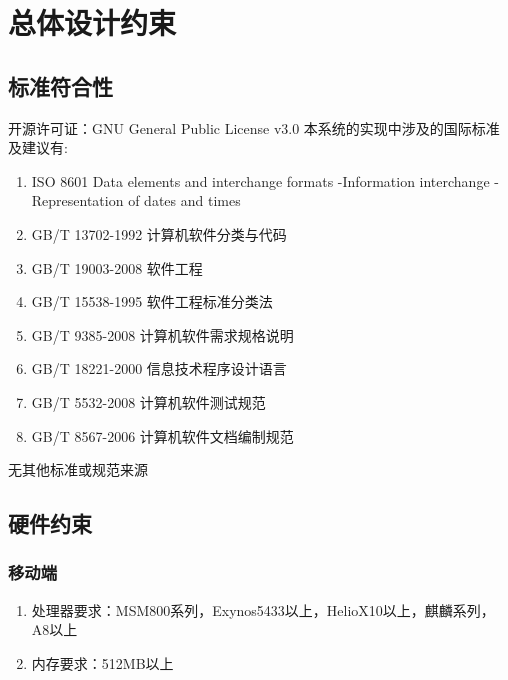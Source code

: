 \chapter{总体设计约束}
\section{标准符合性}
开源许可证：GNU General Public License v3.0
本系统的实现中涉及的国际标准及建议有:
\begin{enumerate}
	\item ISO 8601 Data elements and interchange formats -Information interchange - Representation of dates and times
	\item GB/T 13702-1992 计算机软件分类与代码
	\item GB/T 19003-2008 软件工程
	\item GB/T 15538-1995 软件工程标准分类法
	\item GB/T 9385-2008 计算机软件需求规格说明
	\item GB/T 18221-2000 信息技术程序设计语言
	\item GB/T 5532-2008 计算机软件测试规范
	\item GB/T 8567-2006 计算机软件文档编制规范
\end{enumerate}
无其他标准或规范来源
\section{硬件约束}
\subsection{移动端}
	\begin{enumerate}
		\item 处理器要求：MSM800系列，Exynos5433以上，HelioX10以上，麒麟系列，A8以上
		\item 内存要求：512MB以上
	\end{enumerate}
